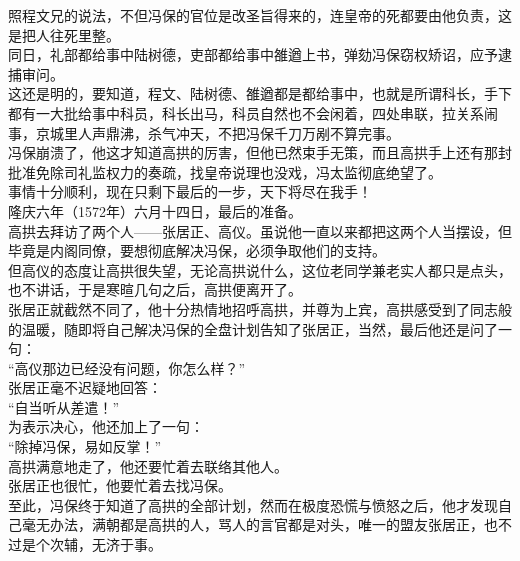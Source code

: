 \begin{multicols}{\theparacolNo}
照程文兄的说法，不但冯保的官位是改圣旨得来的，连皇帝的死都要由他负责，这是把人往死里整。\\

同日，礼部都给事中陆树德，吏部都给事中雒遒上书，弹劾冯保窃权矫诏，应予逮捕审问。\\

这还是明的，要知道，程文、陆树德、雒遒都是都给事中，也就是所谓科长，手下都有一大批给事中科员，科长出马，科员自然也不会闲着，四处串联，拉关系闹事，京城里人声鼎沸，杀气冲天，不把冯保千刀万剐不算完事。\\

冯保崩溃了，他这才知道高拱的厉害，但他已然束手无策，而且高拱手上还有那封批准免除司礼监权力的奏疏，找皇帝说理也没戏，冯太监彻底绝望了。\\

事情十分顺利，现在只剩下最后的一步，天下将尽在我手！\\

隆庆六年（1572年）六月十四日，最后的准备。\\

高拱去拜访了两个人——张居正、高仪。虽说他一直以来都把这两个人当摆设，但毕竟是内阁同僚，要想彻底解决冯保，必须争取他们的支持。\\

但高仪的态度让高拱很失望，无论高拱说什么，这位老同学兼老实人都只是点头，也不讲话，于是寒暄几句之后，高拱便离开了。\\

张居正就截然不同了，他十分热情地招呼高拱，并尊为上宾，高拱感受到了同志般的温暖，随即将自己解决冯保的全盘计划告知了张居正，当然，最后他还是问了一句：\\

“高仪那边已经没有问题，你怎么样？”\\

张居正毫不迟疑地回答：\\

“自当听从差遣！”\\

为表示决心，他还加上了一句：\\

“除掉冯保，易如反掌！”\\

高拱满意地走了，他还要忙着去联络其他人。\\

张居正也很忙，他要忙着去找冯保。\\

至此，冯保终于知道了高拱的全部计划，然而在极度恐慌与愤怒之后，他才发现自己毫无办法，满朝都是高拱的人，骂人的言官都是对头，唯一的盟友张居正，也不过是个次辅，无济于事。\\


\end{multicols}
